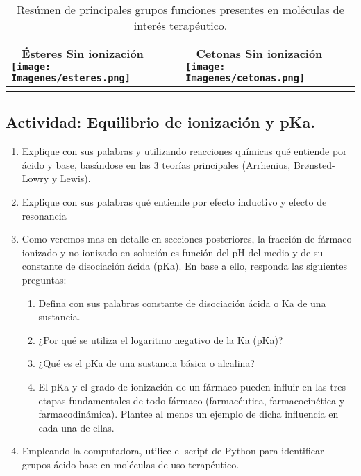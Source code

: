 \documentclass[12pt,a4paper]{article}
\begin{document}
\begin{longtable}{|P{8cm}|P{8cm}|}
	\hline
	~ \newline \textbf{Ésteres} \newline Sin ionización \newline \texttt{[image: Imagenes/esteres.png]} & 
	~ \newline \textbf{Cetonas} \newline Sin ionización \newline \texttt{[image: Imagenes/cetonas.png]}  \\
	\hline
	\caption{Resúmen de principales grupos funciones presentes en moléculas de interés terapéutico.} %
	\label{tab:grupos_funcionales}
	
\end{longtable}


\subsection{Actividad: Equilibrio de ionización y pKa.}

\renewcommand{\labelenumi}{\thesubsection.\arabic{enumi}}

\begin{enumerate}
	\item Explique con sus palabras y utilizando reacciones químicas qué entiende por ácido y base, basándose en las 3 teorías principales (Arrhenius, Brønsted-Lowry y Lewis).
	
	\item Explique con sus palabras qué entiende por efecto inductivo y efecto de resonancia

	\item Como veremos mas en detalle en secciones posteriores, la fracción de fármaco ionizado y no-ionizado en solución es función del pH del medio y de su
	constante de disociación ácida (pKa). En base a ello, responda las siguientes preguntas:
		\begin{enumerate}
			\item Defina con sus palabras constante de disociación ácida o Ka de una sustancia.
			\item ¿Por qué se utiliza el logaritmo negativo de la Ka (pKa)?
			\item ¿Qué es el pKa de una sustancia básica o alcalina?
			\item  El pKa y el grado de ionización de un fármaco pueden influir en las tres etapas
			fundamentales de todo fármaco (farmacéutica, farmacocinética y farmacodinámica). Plantee al menos un ejemplo de dicha influencia en cada una de ellas.
		\end{enumerate}
		
	\item Empleando la computadora, utilice el script de Python para identificar grupos ácido-base en moléculas de uso terapéutico.
	
\end{enumerate}
	
\end{document}
